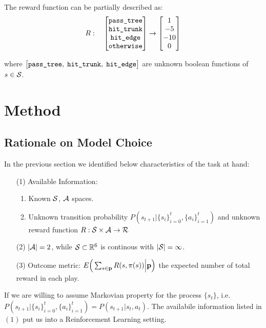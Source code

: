 \documentclass[11pt]{article}
\theoremstyle{definition}
\begin{document}
The reward function can be partially described as:
\begin{align*}
R: \quad
\begin{bmatrix}
\mbox{{\tt pass\_tree}} \\
\mbox{{\tt hit\_trunk}} \\
\mbox{{\tt hit\_edge}} \\
\mbox{{\tt otherwise}} \\
\end{bmatrix}
\rightarrow
\begin{bmatrix}
1 \\ -5 \\ -10 \\ 0
\end{bmatrix}
\end{align*}

where $\big[ \mbox{{\tt pass\_tree}}, \; \mbox{{\tt hit\_trunk}}, \; \mbox{{\tt hit\_edge}} \big]$ are unknown boolean functions of $s\in {\cal S}$.

\section{\textbf{Method}}

\subsection{\textbf{Rationale on Model Choice}}
In the previous section we identified below characteristics of the task at hand:
\begin{enumerate}
\item [(1)] Available Information:
\begin{enumerate}
\item Known ${\cal S}$, ${\cal A}$ spaces. 
\item Unknown transition probability $P(s_{t+1} \big| \{s_i\}_{i=0}^{t}, \{a_i\}_{i=1}^{t})$ and unknown reward function $R: {\cal S} \times {\cal A} \rightarrow {\cal R}$
\end{enumerate}
\item [(2)] $|{\cal A}| = 2$, while ${\cal S} \subset \mathbb{R}^6$ is continous with $|{\cal S}| = \infty$. 
\item [(3)] Outcome metric: 
$E \Big( \sum_{s \in {\bf p}} R(s, \pi(s)) \Big| {\bf p} \Big)$ the expected number of total reward in each play.
\end{enumerate}

If we are willing to assume Markovian property for the process $\{s_t\}$, i.e. $P(s_{t+1} \big| \{s_i\}_{i=0}^{t}, \{a_i\}_{i=1}^{t}) = P(s_{t+1} \big| s_t, a_t) $. The availabile information listed in $(1)$ put us into a Reinforcement Learning setting.
\end{document}
